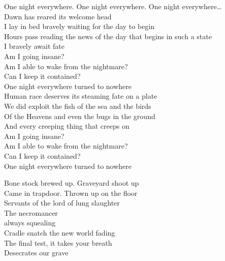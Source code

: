 


One night everywhere. One night everywhere. One night everywhere… \\

Dawn has reared its welcome head \\
I lay in bed bravely waiting for the day to begin \\

Hours pass reading the news of the day that begins in such a state \\
I bravely await fate \\

Am I going insane? \\
Am I able to wake from the nightmare? \\
Can I keep it contained? \\
One night everywhere turned to nowhere \\

Human race deserves its steaming fate on a plate \\
We did exploit the fish of the sea and the birds \\
Of the Heavens and even the bugs in the ground \\
And every creeping thing that creeps on  \\

Am I going insane? \\
Am I able to wake from the nightmare? \\
Can I keep it contained? \\
One night everywhere turned to nowhere \\




Bone stock brewed up. Graveyard shoot up \\
Came in trapdoor. Thrown up on the floor \\
Servants of the lord of lung slaughter \\
The necromancer \\

 always squealing \\
Cradle snatch the new world fading \\
The final test, it takes your breath \\
Desecrates our grave \\

